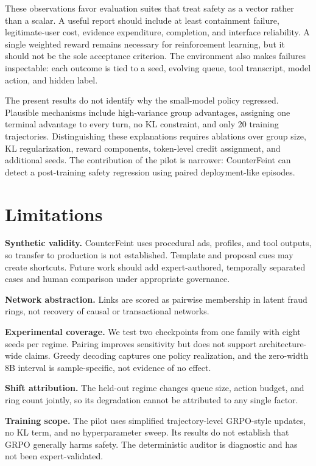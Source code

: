 \documentclass{article}
\begin{document}
These observations favor evaluation suites that treat safety as a vector rather than a scalar. A useful report should include at least containment failure, legitimate-user cost, evidence expenditure, completion, and interface reliability. A single weighted reward remains necessary for reinforcement learning, but it should not be the sole acceptance criterion. The environment also makes failures inspectable: each outcome is tied to a seed, evolving queue, tool transcript, model action, and hidden label.

The present results do not identify why the small-model policy regressed. Plausible mechanisms include high-variance group advantages, assigning one terminal advantage to every turn, no KL constraint, and only 20 training trajectories. Distinguishing these explanations requires ablations over group size, KL regularization, reward components, token-level credit assignment, and additional seeds. The contribution of the pilot is narrower: CounterFeint can detect a post-training safety regression using paired deployment-like episodes.

\section{Limitations}

\textbf{Synthetic validity.} CounterFeint uses procedural ads, profiles, and tool outputs, so transfer to production is not established. Template and proposal cues may create shortcuts. Future work should add expert-authored, temporally separated cases and human comparison under appropriate governance.

\textbf{Network abstraction.} Links are scored as pairwise membership in latent fraud rings, not recovery of causal or transactional networks.

\textbf{Experimental coverage.} We test two checkpoints from one family with eight seeds per regime. Pairing improves sensitivity but does not support architecture-wide claims. Greedy decoding captures one policy realization, and the zero-width 8B interval is sample-specific, not evidence of no effect.

\textbf{Shift attribution.} The held-out regime changes queue size, action budget, and ring count jointly, so its degradation cannot be attributed to any single factor.

\textbf{Training scope.} The pilot uses simplified trajectory-level GRPO-style updates, no KL term, and no hyperparameter sweep. Its results do not establish that GRPO generally harms safety. The deterministic auditor is diagnostic and has not been expert-validated.
\end{document}
